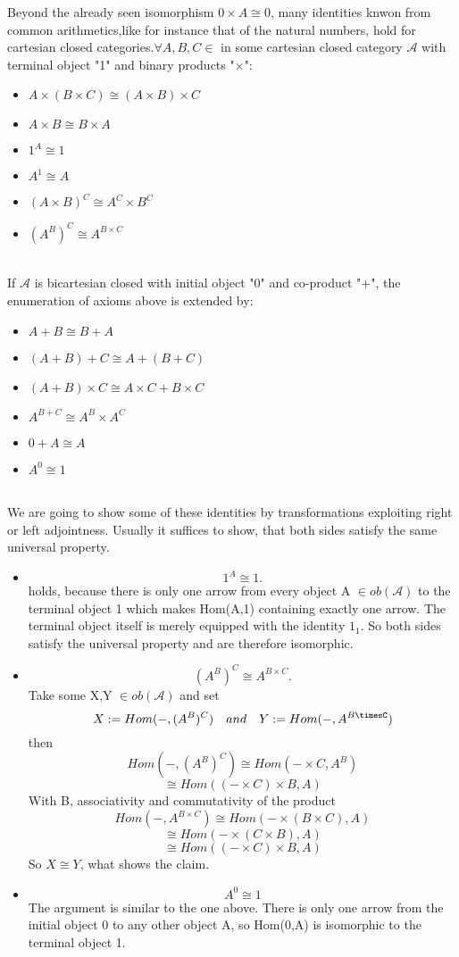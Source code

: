 Beyond the already seen isomorphism $0 \times A \cong 0$, many identities knwon from common arithmetics,like for instance that of the natural numbers,
hold for cartesian closed categories.$\forall A, B, C \in $ in some cartesian closed category $\mathcal{A}$ with terminal object "1" and binary products "$\times$": \\
\begin{itemize}
\item $A \times (B \times C) \cong (A \times B) \times C$
\item $A \times B \cong B \times A$
\item $ 1^A \cong 1 $
\item $ A^1 \cong A$
\item $(A \times B)^C \cong A^C \times B^C$
\item $(A^B)^C \cong A^{B \times C} $
\end{itemize}
\\
If $\mathcal{A}$ is bicartesian closed with initial object "0" and co-product "+", the enumeration of axioms above is extended by: 
\begin{itemize}
\item $A+B \cong B+A$
\item $(A+B)+C \cong A+(B+C)$
\item $(A+B)\times C \cong A \times C+B \times C$
\item $A^{B+C} \cong A^B \times A^C $
\item $0+A \cong A$
\item $A^0 \cong 1$
\end{itemize}
\\
We are going to show some of these identities by transformations exploiting right or left adjointness.
Usually it suffices to show, that both sides satisfy the same universal property.
\begin{itemize}
\item $$1^A \cong 1.$$
  holds, because there is only one arrow from every object A $\in ob(\mathcal{A})$ to the terminal object 1 which makes Hom(A,1) containing exactly one arrow. The terminal object itself is merely equipped with the identity $1_1$.
  So both sides satisfy the universal property and are therefore isomorphic.
  \\

\item $$(A^B)^C \cong A^{B \times C}.$$
  Take some X,Y $\in ob(\mathcal{A})$ and set
  $$ X:=Hom(-, (A^B)^C) \quad and \quad Y:= Hom(-,A^{B\timesC})$$ then
  $$ Hom(-, (A^B)^C) \cong Hom(-\times C, A^B) $$
  $$ \cong Hom((- \times C)\times B,A) $$
  With B, associativity and commutativity of the product
  $$ Hom(-,A^{B\times C}) \cong Hom(- \times (B\times C),A) $$
  $$ \cong Hom(-\times (C\times B),A) $$
  $$ \cong Hom((-\times C)\times B,A) $$
  So $X \cong Y$, what shows the claim.
\item $$A^0 \cong 1$$
  The argument is similar to the one above. There is only one arrow from the initial object 0 to any other object A, so Hom(0,A) is isomorphic to the terminal object 1.
\end{itemize}

